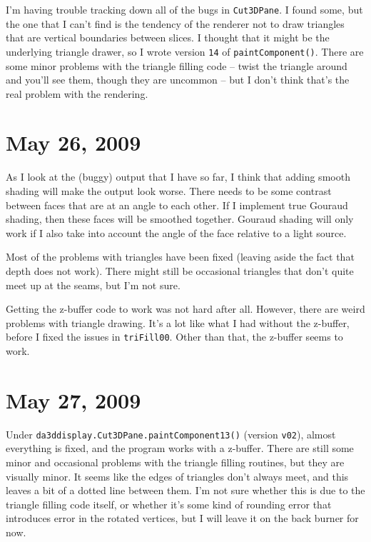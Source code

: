 \documentclass[titlepage,oneside,10pt]{article}
\begin{document}
I'm having trouble tracking down all of the bugs in {\tt Cut3DPane}. I
found some, but the one that I can't find is the tendency of the
renderer not to draw triangles that are vertical boundaries between
slices. I thought that it might be the underlying triangle drawer, so
I wrote version {\tt 14} of {\tt paintComponent()}. There are some
minor problems with the triangle filling code -- twist the triangle
around and you'll see them, though they are uncommon -- but I don't
think that's the real problem with the rendering.

\section{May 26, 2009}

As I look at the (buggy) output that I have so far, I think that
adding smooth shading will make the output look worse. There needs to
be some contrast between faces that are at an angle to each other. If
I implement true Gouraud shading, then these faces will be smoothed
together. Gouraud shading will only work if I also take into account
the angle of the face relative to a light source.

Most of the problems with triangles have been fixed (leaving aside the
fact that depth does not work). There might still be occasional
triangles that don't quite meet up at the seams, but I'm not sure.

Getting the z-buffer code to work was not hard after all. However,
there are weird problems with triangle drawing. It's a lot like what I
had without the z-buffer, before I fixed the issues in 
{\tt triFill00}. Other than that, the z-buffer seems to work.

\section{May 27, 2009}

Under {\tt da3ddisplay.Cut3DPane.paintComponent13()} (version 
{\tt v02}), almost everything is fixed, and the program works with a 
z-buffer. There are still some minor and occasional problems with the
triangle filling routines, but they are visually minor. It seems like
the edges of triangles don't always meet, and this leaves a bit of a
dotted line between them. I'm not sure whether this is due to the
triangle filling code itself, or whether it's some kind of rounding
error that introduces error in the rotated vertices, but I will
leave it on the back burner for now. 
\end{document}
